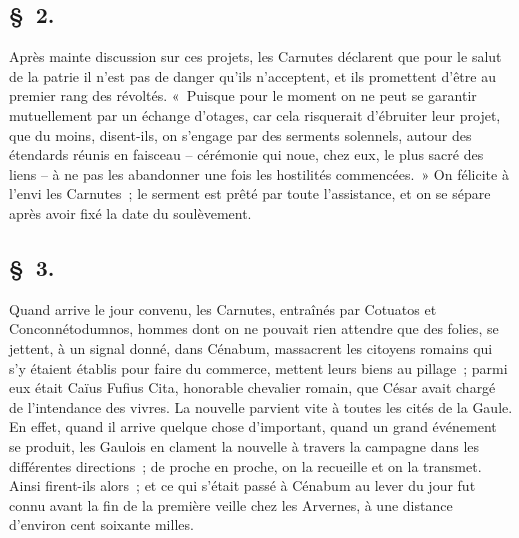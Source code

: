 \documentclass[french,twoside]{book} %
\begin{document}
\subsection[{§ 2.}]{ \textsc{§ 2.} }
\noindent Après mainte discussion sur ces projets, les Carnutes déclarent que pour le salut de la patrie il n’est pas de danger qu’ils n’acceptent, et ils promettent d’être au premier rang des révoltés. « Puisque pour le moment on ne peut se garantir mutuellement par un échange d’otages, car cela risquerait d’ébruiter leur projet, que du moins, disent-ils, on s’engage par des serments solennels, autour des étendards réunis en faisceau – cérémonie qui noue, chez eux, le plus sacré des liens – à ne pas les abandonner une fois les hostilités commencées. » On félicite à l’envi les Carnutes ; le serment est prêté par toute l’assistance, et on se sépare après avoir fixé la date du soulèvement.
\subsection[{§ 3.}]{ \textsc{§ 3.} }
\noindent Quand arrive le jour convenu, les Carnutes, entraînés par Cotuatos et Conconnétodumnos, hommes dont on ne pouvait rien attendre que des folies, se jettent, à un signal donné, dans Cénabum, massacrent les citoyens romains qui s’y étaient établis pour faire du commerce, mettent leurs biens au pillage ; parmi eux était Caïus Fufius Cita, honorable chevalier romain, que César avait chargé de l’intendance des vivres. La nouvelle parvient vite à toutes les cités de la Gaule. En effet, quand il arrive quelque chose d’important, quand un grand événement se produit, les Gaulois en clament la nouvelle à travers la campagne dans les différentes directions ; de proche en proche, on la recueille et on la transmet. Ainsi firent-ils alors ; et ce qui s’était passé à Cénabum au lever du jour fut connu avant la fin de la première veille chez les Arvernes, à une distance d’environ cent soixante milles.
\end{document}
